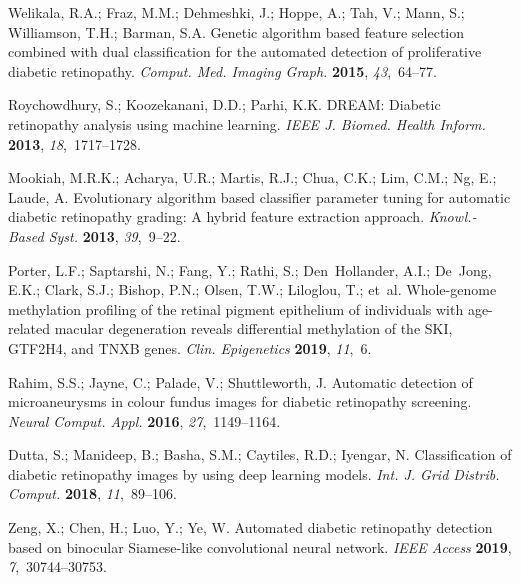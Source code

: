 \documentclass[electronics,article,accept ,moreauthors,pdftex]{mdpi}
\begin{document}
\begin{thebibliography}{999}
Welikala, R.A.; Fraz, M.M.; Dehmeshki, J.; Hoppe, A.; Tah, V.; Mann, S.;
 Williamson, T.H.; Barman, S.A.
Genetic algorithm based feature selection combined with dual
 classification for the automated detection of proliferative diabetic
 retinopathy.
{\em Comput. Med. Imaging Graph.} {\bf 2015}, {\em 43},~64--77.

Roychowdhury, S.; Koozekanani, D.D.; Parhi, K.K.
DREAM: Diabetic retinopathy analysis using machine learning.
{\em IEEE J. Biomed. Health Inform.} {\bf 2013}, {\em 18},~1717--1728.

Mookiah, M.R.K.; Acharya, U.R.; Martis, R.J.; Chua, C.K.; Lim, C.M.; Ng, E.;
 Laude, A.
Evolutionary algorithm based classifier parameter tuning for
 automatic diabetic retinopathy grading: A hybrid feature extraction approach.
{\em Knowl.-Based Syst.} {\bf 2013}, {\em 39},~9--22.


Porter, L.F.; Saptarshi, N.; Fang, Y.; Rathi, S.; Den~Hollander, A.I.; De~Jong,
 E.K.; Clark, S.J.; Bishop, P.N.; Olsen, T.W.; Liloglou, T.; et~al.
Whole-genome methylation profiling of the retinal pigment epithelium
 of individuals with age-related macular degeneration reveals differential
 methylation of the SKI, GTF2H4, and TNXB genes.
{\em Clin. Epigenetics} {\bf 2019}, {\em 11},~6.

Rahim, S.S.; Jayne, C.; Palade, V.; Shuttleworth, J.
Automatic detection of microaneurysms in colour fundus images for
 diabetic retinopathy screening.
{\em Neural Comput. Appl.} {\bf 2016}, {\em
 27},~1149--1164.

Dutta, S.; Manideep, B.; Basha, S.M.; Caytiles, R.D.; Iyengar, N.
Classification of diabetic retinopathy images by using deep learning
 models.
{\em Int. J. Grid Distrib. Comput.} {\bf
 2018}, {\em 11},~89--106.

Zeng, X.; Chen, H.; Luo, Y.; Ye, W.
Automated diabetic retinopathy detection based on binocular
 Siamese-like convolutional neural network.
{\em IEEE Access} {\bf 2019}, {\em 7},~30744--30753.


\end{thebibliography}
\end{document}
